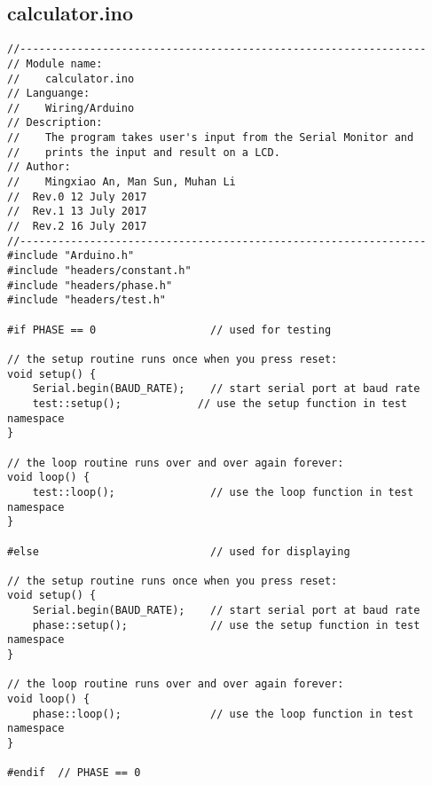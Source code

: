 \subsection{calculator.ino}
\begin{verbatim}
//----------------------------------------------------------------
// Module name:
//    calculator.ino
// Languange:
//    Wiring/Arduino
// Description:
//    The program takes user's input from the Serial Monitor and
//	  prints the input and result on a LCD.
// Author:
//	  Mingxiao An, Man Sun, Muhan Li
//	Rev.0 12 July 2017
//  Rev.1 13 July 2017
//  Rev.2 16 July 2017
//----------------------------------------------------------------
#include "Arduino.h"
#include "headers/constant.h"
#include "headers/phase.h"
#include "headers/test.h"

#if PHASE == 0					// used for testing

// the setup routine runs once when you press reset:
void setup() {
    Serial.begin(BAUD_RATE);	// start serial port at baud rate
    test::setup();			  // use the setup function in test namespace
}

// the loop routine runs over and over again forever:
void loop() {
    test::loop();				// use the loop function in test namespace
}

#else							// used for displaying

// the setup routine runs once when you press reset:
void setup() {
    Serial.begin(BAUD_RATE);	// start serial port at baud rate
    phase::setup();				// use the setup function in test namespace
}

// the loop routine runs over and over again forever:
void loop() {
    phase::loop();				// use the loop function in test namespace
}

#endif	// PHASE == 0

\end{verbatim}